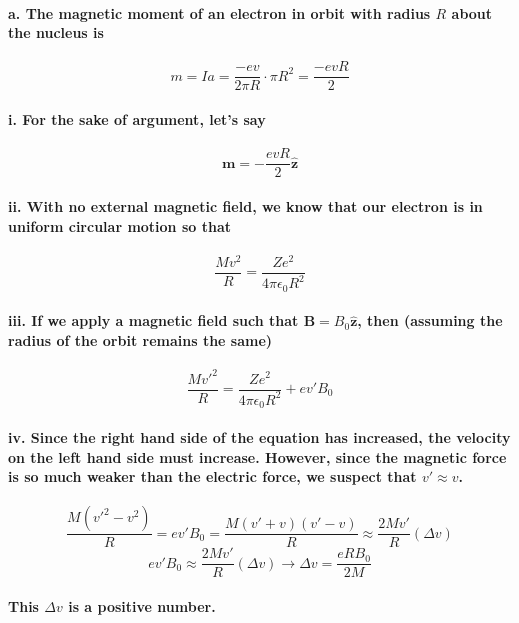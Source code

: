 \documentclass{article}
\begin{document}
\paragraph{\indent a. The magnetic moment of an electron in orbit with radius $R$ about the nucleus is}
\begin{equation*}
    m=Ia=\frac{-ev}{2\pi R}\cdot\pi R^2=\frac{-evR}{2}
\end{equation*}
\paragraph{\indent\indent i. For the sake of argument, let's say}
\begin{equation*}
    \boldsymbol{m}=-\frac{evR}{2}\hat{\boldsymbol{z}}
\end{equation*}
\paragraph{\indent\indent ii. With no external magnetic field, we know that our electron is in uniform circular motion so that}
\begin{equation*}
    \frac{Mv^2}{R}=\frac{Ze^2}{4\pi\epsilon_0R^2}
\end{equation*}
\paragraph{\indent\indent iii. If we apply a magnetic field such that $\boldsymbol{B}=B_0\hat{\boldsymbol{z}}$, then (assuming the radius of the orbit remains the same)}
\begin{equation*}
    \frac{Mv'^2}{R}=\frac{Ze^2}{4\pi\epsilon_0 R^2}+ev'B_0
\end{equation*}
\paragraph{\indent\indent iv. Since the right hand side of the equation has increased, the velocity on the left hand side must increase. However, since the magnetic force is so much weaker than the electric force, we suspect that $v'\approx v$.}
\begin{equation*}
    \frac{M(v'^2-v^2)}{R}=ev'B_0=\frac{M(v'+v)(v'-v)}{R}\approx \frac{2Mv'}{R}(\Delta v)
\end{equation*}
\begin{equation*}
    ev'B_0\approx\frac{2Mv'}{R}(\Delta v)\rightarrow \Delta v =\frac{eRB_0}{2M}
\end{equation*}
\paragraph{This $\Delta v$ is a positive number.}
\end{document}
